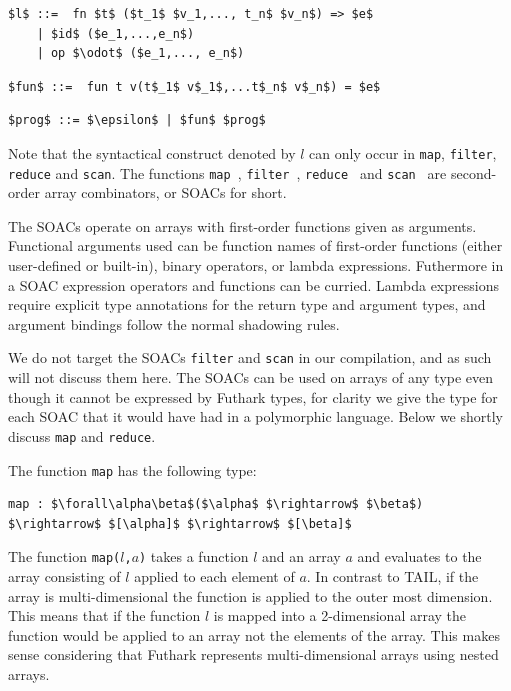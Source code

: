 \documentclass[11pt]{article}
\begin{document}
\begin{lstlisting}[numbers=none,frame=none]
$l$ ::=  fn $t$ ($t_1$ $v_1,..., t_n$ $v_n$) => $e$
    | $id$ ($e_1,...,e_n$)
    | op $\odot$ ($e_1,..., e_n$)
\end{lstlisting}

\begin{lstlisting}[numbers=none,frame=none]
$fun$ ::=  fun t v(t$_1$ v$_1$,...t$_n$ v$_n$) = $e$
\end{lstlisting}

\begin{lstlisting}[numbers=none,frame=none]
$prog$ ::= $\epsilon$ | $fun$ $prog$
\end{lstlisting}

Note that the syntactical construct denoted by $l$ can only occur in {\tt map}, {\tt filter}, {\tt reduce} and {\tt scan}.
The functions {\tt map }, {\tt filter }, {\tt reduce } and {\tt scan } are second-order array combinators, or SOACs for short.

The SOACs operate on arrays with first-order functions given as arguments.
Functional arguments used can be function names of first-order functions (either user-defined or built-in), 
binary operators, or lambda expressions.
Futhermore in a SOAC expression operators and functions can be curried. Lambda expressions require explicit type annotations for
the return type and argument types, and argument bindings follow the normal shadowing rules.

We do not target the SOACs {\tt filter} and {\tt scan} in our compilation, and as such will not discuss them here.
The SOACs can be used on arrays of any type even though it cannot be expressed by Futhark types, for clarity we give the type for each SOAC that it would have had in a polymorphic language.
Below we shortly discuss {\tt map} and {\tt reduce}.

The function {\tt map} has the following type: 
\begin{lstlisting}[numbers=none,frame=none]
map : $\forall\alpha\beta$($\alpha$ $\rightarrow$ $\beta$) $\rightarrow$ $[\alpha]$ $\rightarrow$ $[\beta]$
\end{lstlisting}
The function {\tt map($l$,$a$)} takes a function $l$ and an array $a$ and evaluates to the array consisting of $l$ applied to each element of $a$.
In contrast to TAIL, if the array is multi-dimensional the function is applied to the outer most dimension.
This means that if the function $l$ is mapped into a 2-dimensional array the function would be applied to an array not the elements
of the array. This makes sense considering that Futhark represents multi-dimensional arrays using nested arrays.\\
\end{document}
